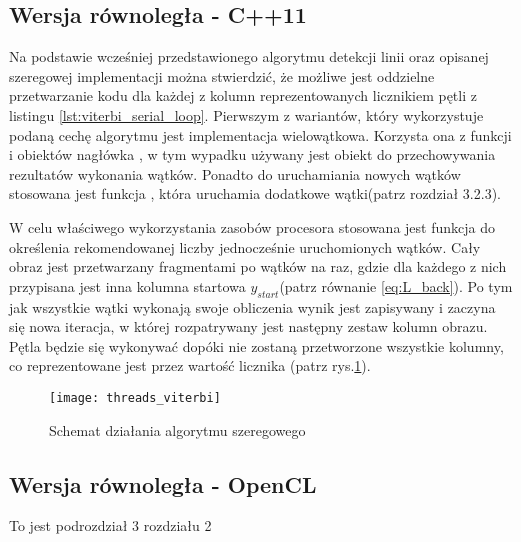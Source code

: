 \documentclass[document.tex]{subfiles}
\begin{document}
\clearpage
\subsection{Wersja równoległa - C++11}
Na podstawie wcześniej przedstawionego algorytmu detekcji linii oraz opisanej szeregowej implementacji można
stwierdzić, że możliwe jest oddzielne przetwarzanie kodu dla każdej z kolumn reprezentowanych licznikiem
 pętli z listingu \ref{lst:viterbi_serial_loop}. Pierwszym z wariantów, który wykorzystuje 
podaną cechę algorytmu jest implementacja wielowątkowa. Korzysta ona z funkcji i obiektów nagłówka , w tym wypadku używany jest obiekt  do przechowywania rezultatów wykonania
wątków. Ponadto do uruchamiania nowych wątków stosowana jest funkcja , która uruchamia dodatkowe wątki(patrz rozdział 3.2.3).
 
W celu właściwego wykorzystania zasobów procesora stosowana jest funkcja  do określenia rekomendowanej liczby jednocześnie uruchomionych wątków.
Cały obraz jest przetwarzany fragmentami po  wątków na raz, gdzie dla każdego z nich przypisana jest inna kolumna startowa $y_{start}$(patrz równanie \ref{eq:L_back}). Po tym jak wszystkie wątki wykonają swoje obliczenia wynik jest zapisywany i zaczyna się nowa iteracja, w której rozpatrywany jest następny zestaw kolumn obrazu. Pętla będzie się wykonywać dopóki nie zostaną przetworzone wszystkie kolumny, co reprezentowane jest przez wartość licznika (patrz rys.\ref{fig:threads_viterbi}).

\begin{figure}[h]
\texttt{[image: threads\_viterbi]}
\caption{Schemat działania algorytmu szeregowego}
\label{fig:threads_viterbi}
\end{figure}

\subsection{Wersja równoległa - OpenCL}
To jest podrozdział 3 rozdziału 2
\end{document}
